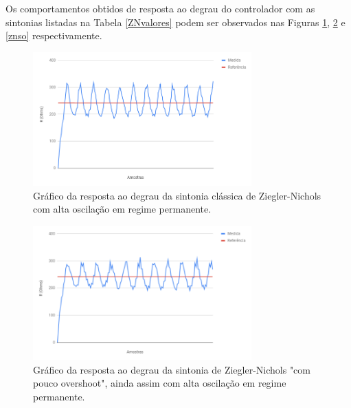 Os comportamentos obtidos de resposta ao degrau do controlador com as sintonias listadas na Tabela \ref{ZNvalores} podem ser observados nas Figuras \ref{znclass}, \ref{znpo} e \ref{znso} respectivamente.
\begin{figure}[ht]
    \begin{center}
    \includegraphics[width=0.75\textwidth]{figuras/znclass.PNG}
    \end{center}
    \caption[Gráfico da sintonia clássica de Ziegler-Nichols.]{Gráfico da resposta ao degrau da sintonia clássica de Ziegler-Nichols com alta oscilação em regime permanente.}
    \label{znclass}
\end{figure}
\begin{figure}[ht]
    \begin{center}
    \includegraphics[width=0.75\textwidth]{figuras/znpo.PNG}
    \end{center}
    \caption[Gráfico da sintonia de Ziegler-Nichols "com pouco overshoot".]{Gráfico da resposta ao degrau da sintonia de Ziegler-Nichols "com pouco overshoot", ainda assim com alta oscilação em regime permanente.}
    \label{znpo}
\end{figure}
